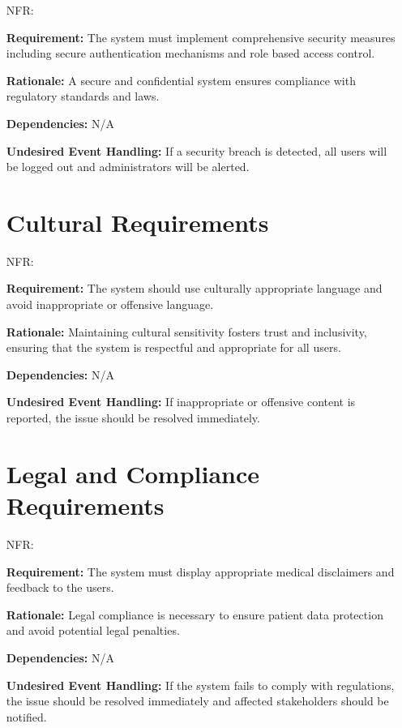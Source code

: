 \documentclass[12pt]{article}
\newcounter{nfrnum} %
\begin{document}
\begin{itemize}
\item[NFR\refstepcounter{nfrnum}\thenfrnum \label{NFR_Security}:] 

\textbf{Requirement:} The system must implement comprehensive security measures including secure authentication mechanisms and role based access control.

\textbf{Rationale:} A secure and confidential system ensures compliance with regulatory standards and laws. 

\textbf{Dependencies:} N/A

\textbf{Undesired Event Handling:} If a security breach is detected, all users will be logged out and administrators will be alerted.

\section{Cultural Requirements}

\item[NFR\refstepcounter{nfrnum}\thenfrnum \label{NFR_Cultural}:] 

\textbf{Requirement:} The system should use culturally appropriate language and avoid inappropriate or offensive language.
    
\textbf{Rationale:} Maintaining cultural sensitivity fosters trust and inclusivity, ensuring that the system is respectful and appropriate for all users.
    
\textbf{Dependencies:} N/A
    
\textbf{Undesired Event Handling:} If inappropriate or offensive content is reported, the issue should be resolved immediately.

\section{Legal and Compliance Requirements}

\item[NFR\refstepcounter{nfrnum}\thenfrnum \label{NFR_Legal}:] 

\textbf{Requirement:} The system must display appropriate medical disclaimers and feedback to the users.

\textbf{Rationale:} Legal compliance is necessary to ensure patient data protection and avoid potential legal penalties.

\textbf{Dependencies:} N/A

\textbf{Undesired Event Handling:} If the system fails to comply with regulations, the issue should be resolved immediately and affected stakeholders should be notified.


\end{itemize}
\end{document}
